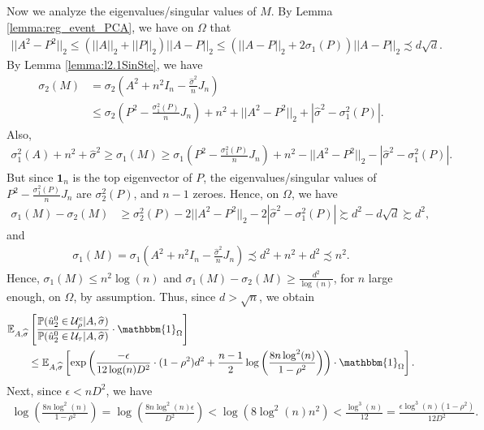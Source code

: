 \documentclass{article}
\newcommand{\mprob}{\mathbb{P}}
\newcommand{\sigmahat}{\ensuremath{\widehat{\sigma}}}
\begin{document}
Now we analyze the eigenvalues/singular values of $M$. By Lemma \ref{lemma:reg_event_PCA}, we have on $\Omega$ that
\begin{align*}
||A^2 - P^2||_2 \leq (||A||_2 + ||P||_2)||A - P||_2 \leq (||A - P||_2 + 2\sigma_1(P))||A - P||_2 \precsim d\sqrt{d}.
\end{align*}
By Lemma \ref{lemma:l2.1SinSte}, we have
\begin{align*}
\sigma_2(M) & = \sigma_2\left(A^2 + n^2I_n -\frac{\sigmahat^2}{n}J_n\right) \\
%
& \leq \sigma_2\left(P^2 - \frac{\sigma^2_1(P)}{n}J_n\right) + n^2 + ||A^2 - P^2||_2 + |\sigmahat^2 - \sigma^2_1(P)|. 
\end{align*}
Also, 
\begin{align*}
\sigma_1^2(A) + n^2 + \sigmahat^2 \geq \sigma_1\left(M\right) \geq \sigma_1\left(P^2 - \frac{\sigma^2_1(P)}{n}J_n\right) + n^2 - ||A^2 - P^2||_2 - |\sigmahat^2 - \sigma^2_1(P)|.
\end{align*}
But since $\mathbf{1}_n$ is the top eigenvector of $P$, the eigenvalues/singular values of $P^2 - \frac{\sigma^2_1(P)}{n}J_n$ are $\sigma^2_2(P)$, and $n - 1$ zeroes. Hence, on $\Omega$, we have 
\begin{align*}
\sigma_1\left(M\right) - \sigma_2\left(M\right) &\geq \sigma_2^2(P) - 2||A^2 - P^2||_2 - 2|\sigmahat^2 - \sigma^2_1(P)| \succsim d^2 - d\sqrt{d} \succsim d^2,
\end{align*}
and 
\begin{align*}
\sigma_1(M) = \sigma_1\left(A^2 + n^2I_n -\frac{\sigmahat^2}{n}J_n\right) \precsim d^2 + n^2 + d^2 \precsim n^2.
\end{align*}
Hence, $\sigma_1(M) \leq n^2\log(n)$ and $\sigma_1(M) - \sigma_2(M) \geq \frac{d^2}{\log(n)}$, for $n$ large enough, on $\Omega$, by assumption. Thus, since $d > \sqrt{n}$, we obtain 
\begin{align*}
& \mathbb{E}_{A, \sigmahat}\left[\frac{\mprob(\hat{u}_2^0 \in \mathcal{U}^c_\rho|A, \sigmahat)}{\mprob(\hat{u}_2^0 \in \mathcal{U}_\tau|A, \sigmahat)}\cdot \mathbbm{1}_{\Omega}\right] \\
%
& \qquad \leq \mathbb{E}_{A, \sigmahat}\left[\exp\left(\frac{-\epsilon}{12\log(n)D^2} \cdot (1-\rho^2)d^2 + \frac{n-1}{2} \log\left(\frac{8n\log^2(n)}{1-\rho^2}\right)\right)\cdot \mathbbm{1}_{\Omega}\right].
\end{align*}
Next, since $\epsilon < nD^2$, we have
\begin{align*}
\log\left(\frac{8n\log^2(n)}{1 - \rho^2}\right) = \log\left(\frac{8n\log^2(n)\epsilon}{D^2}\right) < \log(8\log^2(n)n^2) < \frac{\log^3(n)}{12} = \frac{\epsilon\log^3(n)(1 - \rho^2)}{12D^2}.
\end{align*}
\end{document}
